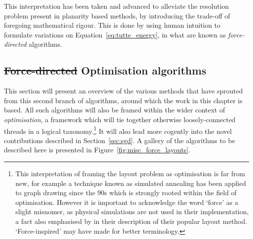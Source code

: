 This interpretation has been taken and advanced to alleviate the resolution problem present in planarity based methods, by introducing the trade-off of foregoing mathematical rigour. 
This is done by using human intuition to formulate variations on Equation~\eqref{eq:tutte_energy}, in what are known as \emph{force-directed} algorithms.

\subsection{\texorpdfstring{\st{Force-directed}{ Optimisation algorithms}}{}}
\label{sec:force_background}
This section will present an overview of the various methods that have sprouted from this second branch of algorithms, around which the work in this chapter is based. All such algorithms will also be framed within the wider context of \emph{optimisation}, a framework which will tie together otherwise loosely-connected threads in a logical taxonomy.\footnote{This interpretation of framing the layout problem as optimisation is far from new, for example a technique known as simulated annealing has been applied to graph drawing since the 90s \citep{Davidson1996} which is strongly rooted within the field of optimisation. However it is important to acknowledge the word `force' as a slight misnomer, as physical simulations are not used in their implementation, a fact also emphasised by \citet{Fruchterman1991} in their description of their popular layout method. `Force-inspired' may have made for better terminology.}
It will also lead more cogently into the novel contributions described in Section~\ref{sec:sgd}.
A gallery of the algorithms to be described here is presented in Figure~\ref{fig:misc_force_layouts}.

